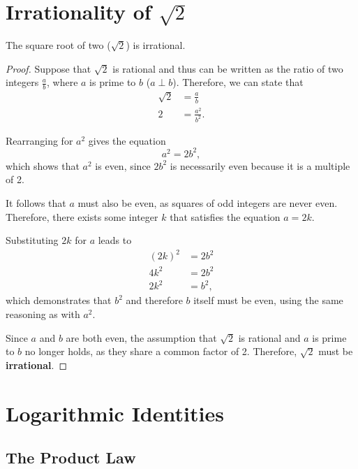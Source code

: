 \documentclass[parskip]{scrartcl}
\begin{document}
\section{Irrationality of \(\sqrt{2}\)}

\begin{theorem}
  The square root of two (\(\sqrt{2}\)) is irrational.
\end{theorem}

\begin{proof}
  Suppose that \(\sqrt{2}\) is rational and thus can be written as the ratio of
  two integers \(\frac{a}{b}\), where \(a\) is prime to \(b\) (\(a ⟂ b\)).
  Therefore, we can state that
  \begin{align*}
    \sqrt{2} &= \frac{a}{b} \\
    2 &= \frac{a^{2}}{b^{2}}.
  \end{align*}

  Rearranging for \(a^{2}\) gives the equation
  \begin{equation*}
    a^{2} = 2b^{2},
  \end{equation*}
  which shows that \(a^{2}\) is even, since \(2b^{2}\) is necessarily even
  because it is a multiple of 2.

  It follows that \(a\) must also be even, as squares of odd integers are never
  even. Therefore, there exists some integer \(k\) that satisfies the equation
  \(a = 2k\).

  Substituting \(2k\) for \(a\) leads to
  \begin{align*}
    {(2k)}^{2} &= 2b^{2} \\
    4k^{2} &= 2b^{2} \\
    2k^{2} &= b^{2},
  \end{align*}
  which demonstrates that \(b^{2}\) and therefore \(b\) itself must be even,
  using the same reasoning as with \(a^{2}\).

  Since \(a\) and \(b\) are both even, the assumption that \(\sqrt{2}\) is
  rational and \(a\) is prime to \(b\) no longer holds, as they share a common
  factor of 2. Therefore, \(\sqrt{2}\) must be \textbf{irrational}.
\end{proof}

\section{Logarithmic Identities}

\subsection{The Product Law}
\end{document}

